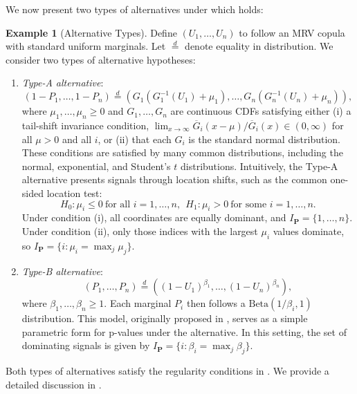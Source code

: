 \documentclass[12pt]{article}
\theoremstyle{plain}
\theoremstyle{plain}
\theoremstyle{definition}
\newtheorem{exmp}{Example}[section]
\begin{document}
We now present two types of alternatives under which  holds:
\begin{exmp}[Alternative Types]\label{exmp:alternative_types}
Define $(U_1, \dots, U_n)$ to follow an MRV copula with standard uniform marginals. Let $\overset{d}{=}$ denote equality in distribution. We consider two types of alternative hypotheses: 
\label{def:alternative-types}
$\ $
\begin{enumerate}[label=(\alph*)]
\item \emph{Type-A alternative}:
\begin{equation*}
    (1-P_1,\dots,1-P_n) \overset{d}{=}(G_1(G^{-1}_1(U_1)+\mu_1),\dots, G_n(G^{-1}_n(U_n)+\mu_n)),
\end{equation*}
where $\mu_1,\dots,\mu_n\ge0$ and $G_1,\dots,G_n$ are continuous CDFs satisfying either (i) a tail-shift invariance condition, $\lim_{x \to \infty} \overline{G}_i(x - \mu)/\overline{G}_i(x) \in (0,\infty)$ for all $\mu > 0$ and all $i$, or (ii) that each $G_i$ is the standard normal distribution. These conditions are satisfied by many common distributions, including the normal, exponential, and Student's $t$ distributions. %
Intuitively, the Type-A alternative presents signals through location shifts, such as the common one-sided location test: 
\[
H_0:\mu_i\leq 0~\text{for all }i=1,\dots,n,~~H_1:\mu_i>0~\text{for some }i=1,\dots,n.
\]
Under condition (i), all coordinates are equally dominant, and $I_{\mathbf{P}} = \{1, \dots, n\}$. Under condition (ii), only those indices with the largest $\mu_i$ values dominate, so $I_{\mathbf{P}} = \{i: \mu_i = \max_j \mu_j\}$.
\item \emph{Type-B alternative}:
\begin{equation*}
    (P_1,\dots,P_n) \overset{d}{=} ((1-U_1)^{\beta_1},\dots,(1-U_n)^{\beta_n}),
\end{equation*}
where $\beta_1,\dots,\beta_n \ge 1$. 
Each marginal $P_i$ then follows a $\mathrm{Beta}(1/\beta_i, 1)$ distribution. This model, originally proposed in \citet{Sellke01022001}, serves as a simple parametric form for p-values under the alternative. In this setting, the set of dominating signals is given by $I_{\mathbf{P}} = \{i: \beta_i = \max_j \beta_j\}$.
\end{enumerate}    
Both types of alternatives satisfy the regularity conditions in . We provide a detailed discussion in .
\end{exmp}
\end{document}
